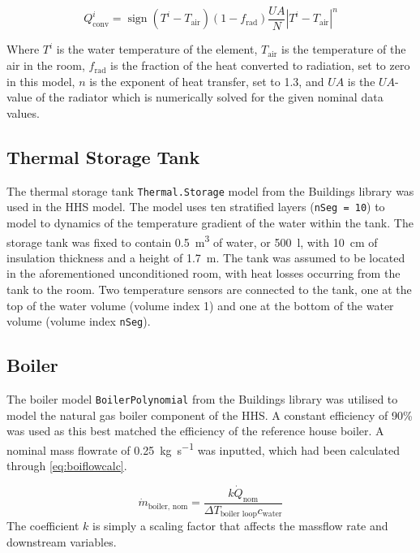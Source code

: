 \begin{equation}
    Q_\text{conv}^i=\operatorname{sign}(T^i-T_\text{air})(1-f_\text{rad})\frac{UA}{N}|T^i-T_\text{air}|^n\label{eq:radiatorheatrans}
\end{equation}

Where $T^i$ is the water temperature of the element, $T_\text{air}$ is the temperature of the air in the room, $f_\text{rad}$ is the fraction of the heat converted to radiation, set to zero in this model, $n$ is the exponent of heat transfer, set to 1.3, and $UA$ is the $UA$-value of the radiator which is numerically solved for the given nominal data values. 

\subsection{Thermal Storage Tank} \label{subsec:tank}
The thermal storage tank \texttt{Thermal.Storage} model from the Buildings library \cite{wetter_modelica_2014} was used in the \ac{HHS} model. The model uses ten stratified layers (\texttt{nSeg = 10}) to model to dynamics of the temperature gradient of the water within the tank. The storage tank was fixed to contain \qty{0.5}{\cubic\meter} of water, or \qty{500}{\litre}, with \qty{10}{\centi\meter} of insulation thickness and a height of \qty{1.7}{\meter}. The tank was assumed to be located in the aforementioned unconditioned room, with heat losses occurring from the tank to the room. Two temperature sensors are connected to the tank, one at the top of the water volume (volume index 1) and one at the bottom of the water volume (volume index \texttt{nSeg}). 

\subsection{Boiler} \label{subsec:boi}
The boiler model \texttt{BoilerPolynomial} from the Buildings library was utilised to model the natural gas boiler component of the \ac{HHS}. A constant efficiency of 90\% was used as this best matched the efficiency of the reference house boiler. A nominal mass flowrate of \qty{0.25}{\kilo\gram\per\second} was inputted, which had been calculated through \cref{eq:boiflowcalc}.

\begin{equation}
    \dot{m}_\text{boiler, nom} = \frac{k\dot{Q}_\text{nom}}{\Delta T_\text{boiler loop}  c_\text{water}} \label{eq:boiflowcalc}
\end{equation}
The coefficient $k$ is simply a scaling factor that affects the massflow rate and downstream variables.

